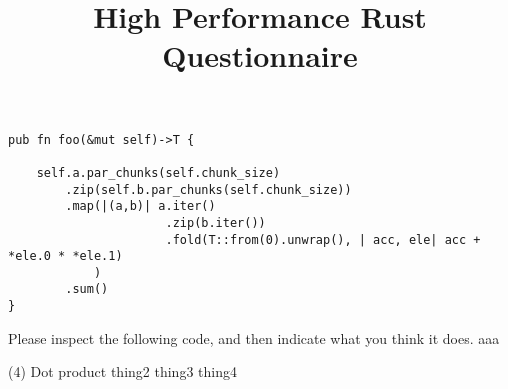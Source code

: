 \documentclass[11pt]{article} %
\begin{document}
\title{High Performance Rust Questionnaire}
\maketitle
\newsavebox\myboxa
\begin{lrbox}{\myboxa}
  \begin{minipage}{\textwidth}
    \begin{lstlisting}
pub fn foo(&mut self)->T {

    self.a.par_chunks(self.chunk_size)
        .zip(self.b.par_chunks(self.chunk_size))
        .map(|(a,b)| a.iter()
                      .zip(b.iter())
                      .fold(T::from(0).unwrap(), | acc, ele| acc + *ele.0 * *ele.1)
            )
        .sum()
}
\end{lstlisting}
\end{minipage}
\end{lrbox}

\begin{question}

Please inspect the following code, and then indicate what you think it does.
aaa
\noindent\usebox\myboxa

\begin{tasks}(4)
  \task Dot product
  \task thing2
  \task thing3
  \task thing4
\end{tasks}

\end{question}
\end{document}
